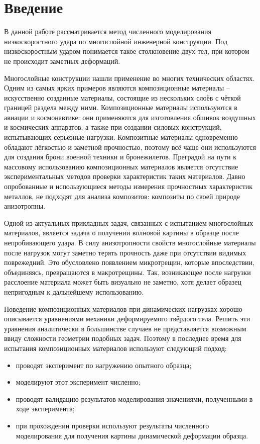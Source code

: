 \section*{Введение}
В данной работе рассматривается метод численного моделирования низкоскоростного
удара по многослойной инженерной конструкции. Под низкоскоростным ударом
понимается такое столкновение двух тел, при котором не происходит заметных
деформаций.

Многослойные конструкции нашли применение во многих технических областях. Одним
из самых ярких примеров являются композиционные материалы -- искусственно
созданные  материалы, состоящие из нескольких слоёв с чёткой границей раздела
между ними. Композиционные материалы используются в авиации и космонавтике: они
применяются для изготовления обшивок воздушных и космических аппаратов, а также
при создании силовых конструкций, испытывающих серьёзные нагрузки. Композитные
материалы одновременно обладают лёгкостью и заметной прочностью, поэтому всё
чаще они используются для создания брони военной техники и бронежилетов.
Преградой на пути к массовому использованию композиционных материалов является
отсутствие экспериментальных методов проверки характеристик таких материалов.
Давно опробованные и использующиеся методы измерения прочностных
характеристик металлов, не подходят для анализа композитов: композиты по своей
природе анизотропны.

Одной из актуальных прикладных задач, связанных с испытанием многослойных
материалов, является задача о получении волновой картины в образце после
непробивающего удара. В силу анизотропности свойств многослойные материалы после
нагрузок могут заметно терять прочность даже при отсутствии видимых поврежедний.
Это обусловлено появлением микротрещин, которые впоследствии, объединяясь,
превращаются в макротрещины. Так, возникающее после нагрузки расслоение
материала может быть визуально не заметно, хотя делает образец непригодным к
дальнейшему использованию.

Поведение композиционных материалов при динамических нагрузках хорошо
описывается уравнениями механики деформируемого твёрдого тела. Решить эти
уравнения аналитически в большинстве случаев не представляется возможным ввиду
сложности геометрии подобных задач. Поэтому в последнее время для испытания
композиционных материалов используют следующий подход:
\begin{itemize}
\item проводят эксперимент по нагружению опытного образца;
\item моделируют этот эксперимент численно;
\item проводят валидацию результатов моделирования значениями, полученными в ходе эксперимента;
\item при прохождении проверки используют результаты численного моделирования
для получения картины динамической деформации образца.
\end{itemize}

